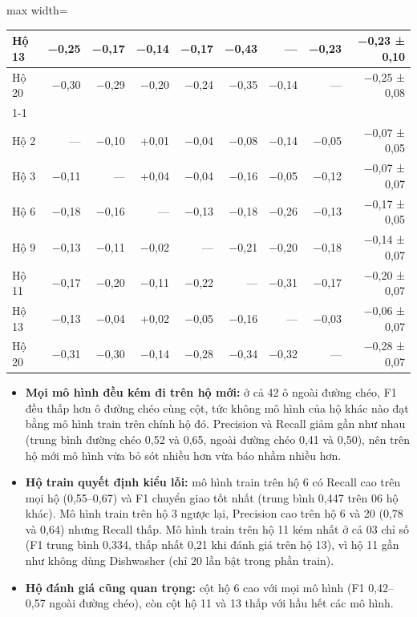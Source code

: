 \begin{table}[H]
\begin{adjustbox}{max width=\linewidth}
\begin{tabular}{|l|r|r|r|r|r|r|r|r|}
Hộ 13 & −0,25 & −0,17 & −0,14 & −0,17 & −0,43 & — & −0,23 & −0,23 ± 0,10 \\ \hline
Hộ 20 & −0,30 & −0,29 & −0,20 & −0,24 & −0,35 & −0,14 & — & −0,25 ± 0,08 \\ \cline{1-1}
\multicolumn{9}{|l|}{\textbf{F1 ↑}} \\ \hline
Hộ 2 & — & −0,10 & +0,01 & −0,04 & −0,08 & −0,14 & −0,05 & −0,07 ± 0,05 \\ \hline
Hộ 3 & −0,11 & — & +0,04 & −0,04 & −0,16 & −0,05 & −0,12 & −0,07 ± 0,07 \\ \hline
Hộ 6 & −0,18 & −0,16 & — & −0,13 & −0,18 & −0,26 & −0,13 & −0,17 ± 0,05 \\ \hline
Hộ 9 & −0,13 & −0,11 & −0,02 & — & −0,21 & −0,20 & −0,18 & −0,14 ± 0,07 \\ \hline
Hộ 11 & −0,17 & −0,20 & −0,11 & −0,22 & — & −0,31 & −0,17 & −0,20 ± 0,07 \\ \hline
Hộ 13 & −0,13 & −0,04 & +0,02 & −0,05 & −0,16 & — & −0,03 & −0,06 ± 0,07 \\ \hline
Hộ 20 & −0,31 & −0,30 & −0,14 & −0,28 & −0,34 & −0,32 & — & −0,28 ± 0,07 \\ \hline
\end{tabular}
\end{adjustbox}
\end{table}

\begin{itemize}
\item \textbf{Mọi mô hình đều kém đi trên hộ mới:} ở cả 42 ô ngoài đường chéo, F1 đều thấp hơn ô đường chéo cùng cột, tức không mô hình của hộ khác nào đạt bằng mô hình train trên chính hộ đó. Precision và Recall giảm gần như nhau (trung bình đường chéo 0,52 và 0,65, ngoài đường chéo 0,41 và 0,50), nên trên hộ mới mô hình vừa bỏ sót nhiều hơn vừa báo nhầm nhiều hơn.
\item \textbf{Hộ train quyết định kiểu lỗi:} mô hình train trên hộ 6 có Recall cao trên mọi hộ (0,55–0,67) và F1 chuyển giao tốt nhất (trung bình 0,447 trên 06 hộ khác). Mô hình train trên hộ 3 ngược lại, Precision cao trên hộ 6 và 20 (0,78 và 0,64) nhưng Recall thấp. Mô hình train trên hộ 11 kém nhất ở cả 03 chỉ số (F1 trung bình 0,334, thấp nhất 0,21 khi đánh giá trên hộ 13), vì hộ 11 gần như không dùng Dishwasher (chỉ 20 lần bật trong phần train).
\item \textbf{Hộ đánh giá cũng quan trọng:} cột hộ 6 cao với mọi mô hình (F1 0,42–0,57 ngoài đường chéo), còn cột hộ 11 và 13 thấp với hầu hết các mô hình.
\end{itemize}

